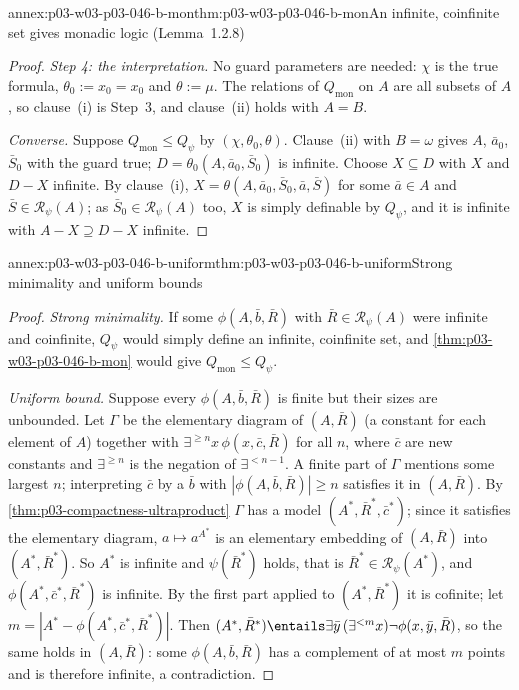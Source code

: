 \begin{annexitem}{annex:p03-w03-p03-046-b-mon}{thm:p03-w03-p03-046-b-mon}{An infinite, coinfinite set gives monadic logic (Lemma~1.2.8)}
\begin{proof}
\emph{Step 4: the interpretation.} No guard parameters are needed: \(\chi\)
is the true formula, \(\theta_0:=x_0=x_0\) and \(\theta:=\mu\). The
relations of \(Q_{\mathrm{mon}}\) on \(A\) are all subsets of \(A\), so
clause~(i) is Step~3, and clause~(ii) holds with \(A=B\).

\emph{Converse.} Suppose \(Q_{\mathrm{mon}}\le Q_\psi\) by
\((\chi,\theta_0,\theta)\). Clause~(ii) with \(B=\omega\) gives \(A\),
\(\bar a_0\), \(\bar S_0\) with the guard true; \(D=\theta_0(A,\bar
a_0,\bar S_0)\) is infinite. Choose \(X\subseteq D\) with \(X\) and
\(D-X\) infinite. By clause~(i), \(X=\theta(A,\bar a_0,\bar S_0,\bar
a,\bar S)\) for some \(\bar a\in A\) and \(\bar S\in\mathscr R_\psi(A)\);
as \(\bar S_0\in\mathscr R_\psi(A)\) too, \(X\) is simply definable by
\(Q_\psi\), and it is infinite with \(A-X\supseteq D-X\) infinite.
\end{proof}
\end{annexitem}

\begin{annexitem}{annex:p03-w03-p03-046-b-uniform}{thm:p03-w03-p03-046-b-uniform}{Strong minimality and uniform bounds}
\begin{proof}
\emph{Strong minimality.} If some \(\phi(A,\bar b,\bar R)\) with \(\bar
R\in\mathscr R_\psi(A)\) were infinite and coinfinite, \(Q_\psi\) would
simply define an infinite, coinfinite set, and
\cref{thm:p03-w03-p03-046-b-mon} would give \(Q_{\mathrm{mon}}\le Q_\psi\).

\emph{Uniform bound.} Suppose every \(\phi(A,\bar b,\bar R)\) is finite
but their sizes are unbounded. Let \(\Gamma\) be the elementary diagram of
\((A,\bar R)\) (a constant for each element of \(A\)) together with
\(\exists^{\ge n}x\,\phi(x,\bar c,\bar R)\) for all \(n\), where \(\bar
c\) are new constants and \(\exists^{\ge n}\) is the negation of
\(\exists^{<n-1}\). A finite part of \(\Gamma\) mentions some largest
\(n\); interpreting \(\bar c\) by a \(\bar b\) with
\(|\phi(A,\bar b,\bar R)|\ge n\) satisfies it in \((A,\bar R)\). By
\cref{thm:p03-compactness-ultraproduct} \(\Gamma\) has a model
\((A^*,\bar R^*,\bar c^*)\); since it satisfies the elementary diagram,
\(a\mapsto a^{A^*}\) is an elementary embedding of \((A,\bar R)\) into
\((A^*,\bar R^*)\). So \(A^*\) is infinite and \(\psi(\bar R^*)\) holds,
that is \(\bar R^*\in\mathscr R_\psi(A^*)\), and
\(\phi(A^*,\bar c^*,\bar R^*)\) is infinite. By the first part applied to
\((A^*,\bar R^*)\) it is cofinite; let \(m=|A^*-\phi(A^*,\bar c^*,\bar
R^*)|\). Then \((A^*,\bar R^*)\entails\exists\bar
y\,(\exists^{<m}x)\neg\phi(x,\bar y,\bar R)\), so the same holds in
\((A,\bar R)\): some \(\phi(A,\bar b,\bar R)\) has a complement of at most
\(m\) points and is therefore infinite, a contradiction.
\end{proof}
\end{annexitem}

